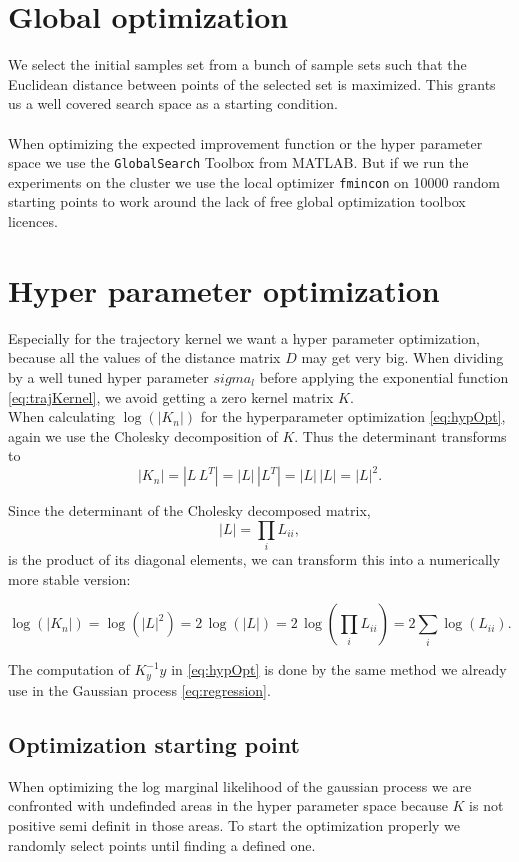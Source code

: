\section{Global optimization}
We select the initial samples set from a bunch of sample sets such that the Euclidean distance between points of the selected set is maximized. This grants us a well covered search space as a starting condition.
\\\\
When optimizing the expected improvement function or the hyper parameter space we use the \texttt{GlobalSearch} Toolbox from MATLAB. But if we run the experiments on the cluster we use the local optimizer \texttt{fmincon} on 10000 random starting points to work around the lack of free global optimization toolbox licences.


\section{Hyper parameter optimization}

Especially for the trajectory kernel we want a hyper parameter optimization, because all the values of the distance matrix $D$ may get very big. When dividing by a well tuned hyper parameter $sigma_l$ before applying the exponential function \eqref{eq:trajKernel}, we avoid getting a zero kernel matrix $K$.\\

When calculating $\log(|K_n|)$ for the hyperparameter optimization \eqref{eq:hypOpt}, again we use the Cholesky decomposition of $K$. Thus the determinant transforms to
$$|K_n|=|L\,L^{T}|=|L|\,|L^{T}|=|L|\,|L|=|L|^{2}.$$

Since the determinant of the Cholesky decomposed matrix,
$$|L| = \textstyle\prod_{i} L_{ii},$$
is the product of its diagonal elements, we can transform this into a numerically more stable version:

$$\log(|K_n|) = \log(|L|^{2}) = 2\,\log(|L|) = 2\,\log(\textstyle\prod_{i} L_{ii}) = 2\textstyle\sum_{i} \log(L_{ii}).$$

The computation of $K_y^{-1}y$ in \eqref{eq:hypOpt} is done by the same method we already use in the Gaussian process \eqref{eq:regression}.

\subsection{Optimization starting point}
When optimizing the log marginal likelihood of the gaussian process we are confronted with undefinded areas in the hyper parameter space because $K$ is not positive semi definit in those areas. To start the optimization properly we randomly select points until finding a defined one.

